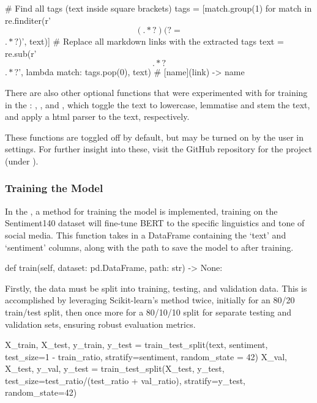         \begin{python}
# Find all tags (text inside square brackets)
tags = [match.group(1) for match in re.finditer(r'\[(.*?)(?=\]\(.*?\))', text)]
# Replace all markdown links with the extracted tags
text = re.sub(r'\[.*?\]\(.*?\)', lambda match: tags.pop(0), text) # [name](link) -> name
        \end{python}

        There are also other optional functions that were experimented with for training in the : , , and , which toggle the text to lowercase, lemmatise and stem the text, and apply a  html parser to the text, respectively.

        These functions are toggled off by default, but may be turned on by the user in settings. For further insight into these, visit the GitHub repository for the project \citep{sentimentanalysistool} (under ).

        \subsubsection{Training the Model}
        In the , a method  for training the model is implemented, training on the Sentiment140 \citep{sentiment140dataset} dataset will fine-tune BERT to the specific linguistics and tone of social media. This function takes in a DataFrame containing the `text' and `sentiment' columns, along with the path to save the model to after training.

        \begin{python}
def train(self, dataset: pd.DataFrame, path: str) -> None:
        \end{python}

        Firstly, the data must be split into training, testing, and validation data. This is accomplished by leveraging Scikit-learn's  method twice, initially for an 80/20 train/test split, then once more for a 80/10/10 split for separate testing and validation sets, ensuring robust evaluation metrics.

        \begin{python}
X_train, X_test, y_train, y_test = train_test_split(text, sentiment, test_size=1 - train_ratio, stratify=sentiment, random_state = 42)
X_val, X_test, y_val, y_test = train_test_split(X_test, y_test, test_size=test_ratio/(test_ratio + val_ratio), stratify=y_test, random_state=42)
        \end{python}


